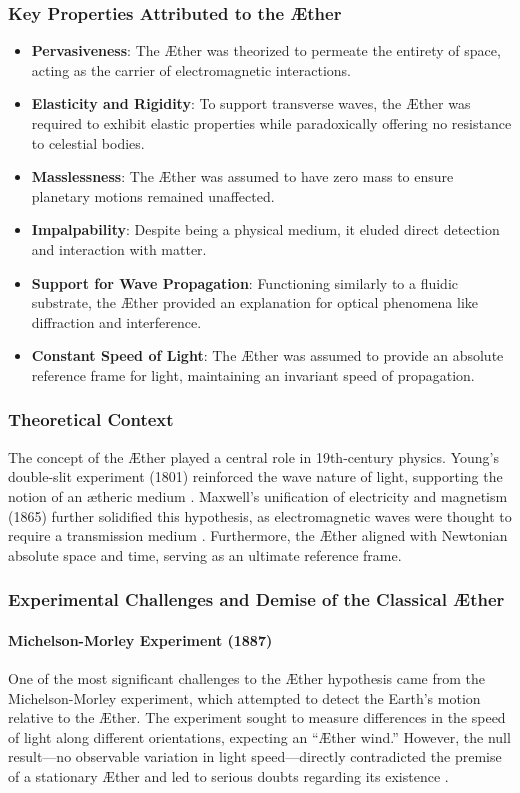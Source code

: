     \subsubsection*{Key Properties Attributed to the Æther}
    \begin{itemize}
        \item \textbf{Pervasiveness}: The Æther was theorized to permeate the entirety of space, acting as the carrier of electromagnetic interactions.
        \item \textbf{Elasticity and Rigidity}: To support transverse waves, the Æther was required to exhibit elastic properties while paradoxically offering no resistance to celestial bodies.
        \item \textbf{Masslessness}: The Æther was assumed to have zero mass to ensure planetary motions remained unaffected.
        \item \textbf{Impalpability}: Despite being a physical medium, it eluded direct detection and interaction with matter.
        \item \textbf{Support for Wave Propagation}: Functioning similarly to a fluidic substrate, the Æther provided an explanation for optical phenomena like diffraction and interference.
        \item \textbf{Constant Speed of Light}: The Æther was assumed to provide an absolute reference frame for light, maintaining an invariant speed of propagation.
    \end{itemize}

    \subsubsection*{Theoretical Context}
    The concept of the Æther played a central role in 19th-century physics. Young’s double-slit experiment (1801) reinforced the wave nature of light, supporting the notion of an ætheric medium \cite{young1801}. Maxwell’s unification of electricity and magnetism (1865) further solidified this hypothesis, as electromagnetic waves were thought to require a transmission medium \cite{maxwell1865}. Furthermore, the Æther aligned with Newtonian absolute space and time, serving as an ultimate reference frame.

    \subsubsection*{Experimental Challenges and Demise of the Classical Æther}
    \paragraph*{Michelson-Morley Experiment (1887)}
    One of the most significant challenges to the Æther hypothesis came from the Michelson-Morley experiment, which attempted to detect the Earth’s motion relative to the Æther. The experiment sought to measure differences in the speed of light along different orientations, expecting an “Æther wind.” However, the null result—no observable variation in light speed—directly contradicted the premise of a stationary Æther and led to serious doubts regarding its existence \cite{michelson1887}.

